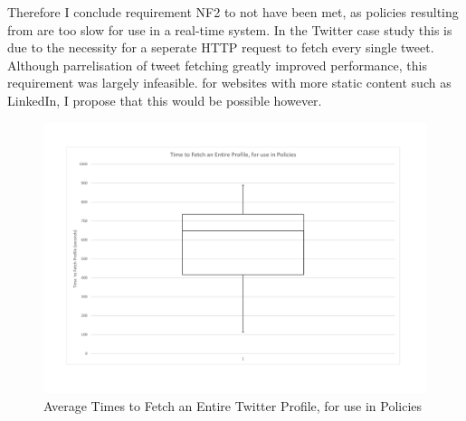 Therefore I conclude requirement NF2 to not have been met, as policies resulting from are too slow for use in a real-time system. In the Twitter case study this is due to the necessity for a seperate HTTP request to fetch every single tweet. Although parrelisation of tweet fetching greatly improved performance, this requirement was largely infeasible. for websites with more static content such as LinkedIn, I propose that this would be possible however. 

\begin{center}
\begin{figure}[h!]
\centering
\includegraphics[width=500px]{Images/Average_Time_To_Fetch_Profile.pdf}
\caption{Average Times to Fetch an Entire Twitter Profile, for use in Policies}
\end{figure}
\end{center}









